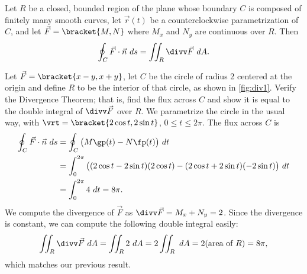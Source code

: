{Let $R$ be a closed, bounded region of the plane whose boundary $C$ is composed of finitely many smooth curves, let $\vec r(t)$ be a counterclockwise parametrization of $C$, and let $\vec F =\bracket{M,N}$ where $M_x$ and $N_y$ are continuous over $R$. Then
\[\oint_C \vec F\cdot \vec n\ ds = \iint_R\divv \vec F\ dA.\]}


{Let $\vec F =\bracket{x-y,x+y}$, let $C$ be the circle of radius 2 centered at the origin and define $R$ to be the interior of that circle, as shown in \autoref{fig:div1}. Verify the Divergence Theorem; that is, find the flux across $C$ and show it is equal to the double integral of $\divv \vec F$ over $R$.}
{We parametrize the circle in the usual way, with $\vrt =\bracket{2\cos t,2\sin t}$, $0\leq t\leq 2\pi$. The flux across $C$ is
\begin{align*}
	\oint_C \vec F\cdot \vec n\ ds
	&= \oint_C\big(M\gp(t)-N\fp(t)\big)\ dt\\
	&= \int_0^{2\pi} \big((2\cos t-2\sin t)(2\cos t) - (2\cos t+2\sin t)(-2\sin t)\big)\ dt\\
	&= \int_0^{2\pi} 4\ dt = 8\pi.
\end{align*}
We compute the divergence of $\vec F$ as $\divv \vec F = M_x+N_y = 2$. Since the divergence is constant, we can compute the following double integral easily:
\[
\iint_R \divv \vec F\ dA = \iint_R 2\ dA = 2\iint_R\ dA
= 2(\text{area of $R$}) = 8\pi,
\]
which matches our previous result.}

